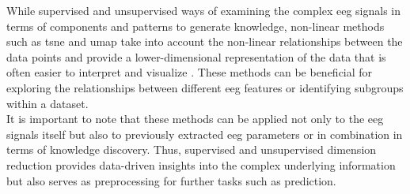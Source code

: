 While supervised and unsupervised ways of examining the complex \gls{eeg} signals in terms of components and patterns to generate knowledge, non-linear methods such as \gls{tsne} and \gls{umap} take into account the non-linear relationships between the data points and provide a lower-dimensional representation of the data that is often easier to interpret and visualize \cite{mcinnes2018umap}. These methods can be beneficial for exploring the relationships between different \gls{eeg} features or identifying subgroups within a dataset.\\
It is important to note that these methods can be applied not only to the \gls{eeg} signals itself but also to previously extracted \gls{eeg} parameters or in combination in terms of knowledge discovery. Thus, supervised and unsupervised dimension reduction provides data-driven insights into the complex underlying information but also serves as preprocessing for further tasks such as prediction.


